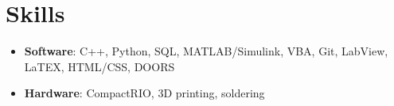 \documentclass[12pt]{article}
\newcommand\firstboxx[2]{\textbf{\fontsize{12.8}{15}\selectfont #1}, \textit{#2}}
\newcommand{\itemheader}[3]{\firstboxx{#1}{#2}\hfill#3}
\begin{document}



\section*{Skills}
\vspace*{-1em}\makebox[\linewidth]{\rule{\textwidth}{0.4pt}}
\begin{itemize}
\item \textbf{Software}: C++, Python, SQL, MATLAB/Simulink, VBA, Git, LabView, LaTEX, HTML/CSS, DOORS
\item \textbf{Hardware}: CompactRIO, 3D printing, soldering
\end{itemize}
\end{document}
